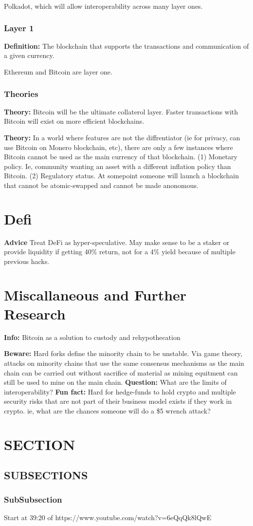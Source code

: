 \documentclass[10pt,twocolumn]{article}
\begin{document}
Polkadot, which will allow interoperability across many layer ones. 

\subsubsection{Layer 1}
{\bf Definition:} The blockchain that supports the transactions and
communication of a given currency. 

Ethereum and Bitcoin are layer one. 

\subsubsection{Theories}
{\bf Theory:} Bitcoin will be the ultimate collaterol layer. Faster transactions
with Bitcoin will exist on more efficient blockchains. 

{\bf Theory:} In a world where features are not the diffrentiator (ie for
privacy, can use Bitcoin on Monero blockchain, etc), there are only a few
instances where Bitcoin cannot be used as the main currency of that blockchain.
(1) Monetary policy. Ie, community wanting an asset with a different inflation
policy than Bitcoin. (2) Regulatory status. At somepoint someone will launch a
blockchain that cannot be atomic-swapped and cannot be made anonomous. 

\section{Defi} %

{\bf Advice} Treat DeFi as hyper-speculative. May make sense to be a staker or
provide liquidity if getting 40\% return, not for a 4\% yield because of
multiple previous hacks. 



\section{Miscallaneous and Further Research}
{\bf Info:} Bitcoin as a solution to custody and rehypothecation

{\bf Beware:} Hard forks define the minority chain to be unstable. Via game
theory, attacks on minority chains that use the same consensus mechanisms as the
main chain can be carried out without sacrifice of material as mining equitment
can still be used to mine on the main chain. 
{\bf Question:} What are the limits of interoperability? 
{\bf Fun fact:} Hard for hedge-funds to hold crypto and multiple security risks
that are not part of their business model exists if they work in crypto. ie,
what are the chances someone will do a \$5 wrench attack?

\section{SECTION}
\subsection{SUBSECTIONS}
\subsubsection{SubSubsection}

Start at 39:20 of https://www.youtube.com/watch?v=6eQqQk8lQwE
\end{document}
